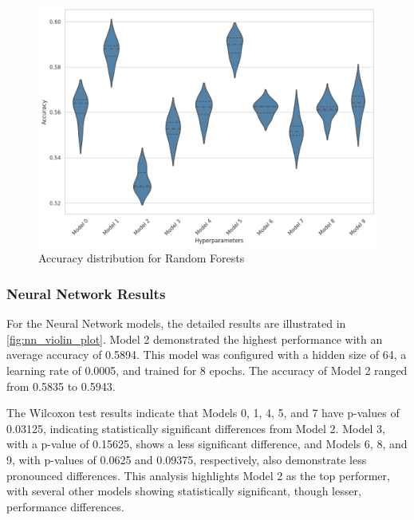 \begin{figure}[H]
    \centering
    \includegraphics[width=0.99\columnwidth]{images/violin_plot_random_forest.png}
    \caption{Accuracy distribution for Random Forests}
    \label{fig:rf_violin_plot}
\end{figure}

\subsubsection{Neural Network Results}

For the Neural Network models, the detailed results 
are illustrated in \autoref{fig:nn_violin_plot}. 
Model 2 demonstrated the highest performance with 
an average accuracy of 0.5894. This model was configured 
with a hidden size of 64, a learning rate of 0.0005, 
and trained for 8 epochs. The accuracy of Model 2 
ranged from 0.5835 to 0.5943.

The Wilcoxon test results indicate that 
Models 0, 1, 4, 5, and 7 have p-values of 0.03125, 
indicating statistically significant differences 
from Model 2. Model 3, with a p-value of 0.15625, 
shows a less significant difference, and 
Models 6, 8, and 9, with p-values of 0.0625 and 0.09375, 
respectively, also demonstrate less pronounced 
differences. This analysis highlights Model 2 as 
the top performer, with several other models 
showing statistically significant, though lesser, 
performance differences.


